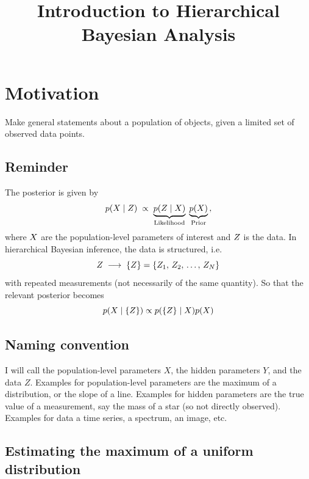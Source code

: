 \documentclass[12pt,a4paper]{article}
\title{{\usefont{T1}{lmss}{b}{n}\selectfont\LARGE Introduction to Hierarchical Bayesian Analysis}}
\author{}
\date{}
\begin{document}
\maketitle

\section{Motivation}

Make general statements about a population of objects, given a limited set of observed data points.



\subsection{Reminder}


The posterior is given by
\[
  p(X\mid Z)\;\propto\;
  \underbrace{p(Z\mid X)}_{\text{Likelihood}}\;
  \underbrace{p(X)}_{\text{Prior}}
  \,,
\]
where $X$ are the population-level parameters of interest and $Z$ is the data. 
In hierarchical Bayesian inference, the data is structured, i.e.
\[
  Z \;\longrightarrow\; \{Z\} = \{Z_1,\, Z_2,\, \ldots,\, Z_N\}
\]
with repeated measurements (not necessarily of the same quantity). 
%
So that the relevant posterior becomes
\[
  p(X\mid\{Z\}) \propto p(\{Z\}\mid X) p(X)
\]


\subsection{Naming convention}

I will call the population-level parameters $X$, the hidden parameters $Y$, and the data $Z$.
Examples for population-level parameters are the maximum of a distribution, or the slope of a line. 
Examples for hidden parameters are the true value of a measurement, say the mass of a star (so not directly observed). 
Examples for data a time series, a spectrum, an image, etc. 








\subsection{Estimating the maximum of a uniform distribution}
\end{document}
